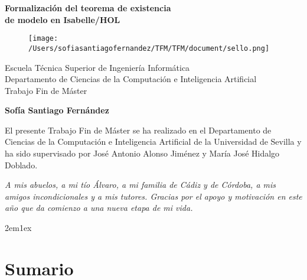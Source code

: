 \documentclass[12pt,a4paper,twoside]{book}
\begin{document}
\begin{titlepage}
 \vspace*{2cm}
  \begin{center}
    {\huge \textbf{Formalización del teorema de existencia \\ \vspace*{1em} de modelo 
                   en Isabelle/HOL}}
  \end{center}
  \vspace{3cm}
  \begin{center}
    \begin{figure}[h]
    \centering
    \texttt{[image: /Users/sofiasantiagofernandez/TFM/TFM/document/sello.png]}
    \end{figure}
  \vspace{3cm}
    {\normalsize Escuela Técnica Superior de Ingeniería Informática}\\
    {\normalsize Departamento de Ciencias de la Computación e Inteligencia Artificial}\\
    {\normalsize Trabajo Fin de Máster} \\
  \end{center}
  \begin{center}
    {\large \textbf{Sofía Santiago Fernández}}
  \end{center}
\end{titlepage}

\newpage

El presente Trabajo Fin de Máster se ha realizado en el Departamento de
Ciencias de la Computación e Inteligencia Artificial de la Universidad
de Sevilla y ha sido supervisado por José Antonio Alonso Jiménez y María
José Hidalgo Doblado.

\vspace{2cm}

\textit{A mis abuelos, a mi tío Álvaro, a mi familia de Cádiz y de Córdoba, a 
mis amigos incondicionales y a mis tutores. Gracias por el apoyo y 
motivación en este año que da comienzo a una nueva etapa de mi vida.}

\newpage

\tableofcontents

\parindent 2em\parskip 1ex

% 
\chapter*{Sumario}

\end{document}
